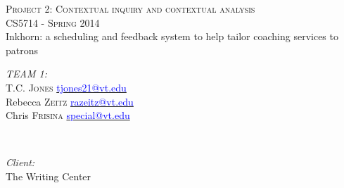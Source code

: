 \documentclass[12pt]{article} %
\begin{document}

\begin{titlepage}

\newcommand{\HRule}{\rule{\linewidth}{0.5mm}} %

\center %

\textsc{\LARGE Project 2: Contextual inquiry and contextual analysis}\\ [0.5cm] %
\textsc{\Large CS5714 - Spring 2014}\\[0.5cm] %



{ \small Inkhorn: a scheduling and feedback system to help tailor coaching services to patrons }\\[0.4cm] %
\vspace{1.5cm}


\begin{minipage}{0.4\textwidth}
\begin{flushleft} \small
\emph{TEAM 1:}\\
T.C. \textsc{Jones} \href{mailto:tjones21@vt.edu}{\textcolor{blue}{tjones21@vt.edu}}\\
Rebecca \textsc{Zeitz} \href{mailto:razeitz@vt.edu}{\textcolor{blue}{razeitz@vt.edu}}\\
Chris \textsc{Frisina}  \href{mailto:special@vt.edu}{\textcolor{blue}{special@vt.edu}}\\
\end{flushleft}
\end{minipage}
~
\begin{minipage}{0.4\textwidth}
\begin{flushright} \small
\emph{Client:} \\
The Writing Center\\
\end{flushright}
\end{minipage}\\[4cm]


\end{titlepage}
\end{document}
